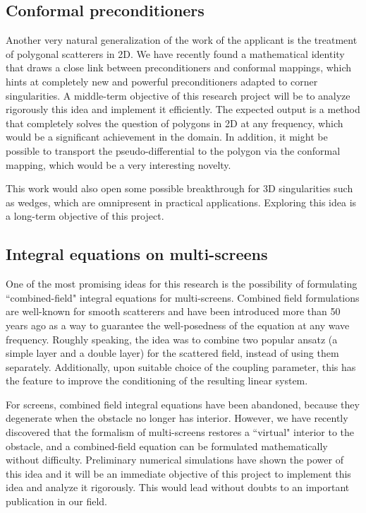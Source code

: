 \documentclass[]{article}
\begin{document}
\subsection*{Conformal preconditioners}

Another very natural generalization of the work of the applicant is the treatment of polygonal scatterers in 2D. We have recently found a mathematical identity that draws a close link between preconditioners and conformal mappings, which hints at completely new and powerful preconditioners adapted to corner singularities. A middle-term objective of this research project will be to analyze rigorously this idea and implement it efficiently. The expected output is a method that completely solves the question of polygons in 2D at any frequency, which would be a significant achievement in the domain. In addition, it might be possible to transport the pseudo-differential to the polygon via the conformal mapping, which would be a very interesting novelty. 

This work would also open some possible breakthrough for 3D singularities such as wedges, which are omnipresent in practical applications. Exploring this idea is a long-term objective of this project.


\subsection*{Integral equations on multi-screens}

One of the most promising ideas for this research is the possibility of formulating ``combined-field" integral equations for multi-screens. Combined field formulations are well-known for smooth scatterers and have been introduced more than 50 years ago \cite{brakhage1965dirichletsehe} as a way to guarantee the well-posedness of the equation at any wave frequency. Roughly speaking, the idea was to combine two popular ansatz (a simple layer and a double layer) for the scattered field, instead of using them separately. Additionally, upon suitable choice of the coupling parameter, this has the feature to improve the conditioning of the resulting linear system. 

For screens, combined field integral equations have been abandoned, because they degenerate when the obstacle no longer has interior. 
However, we have recently discovered that the formalism of multi-screens restores a ``virtual" interior to the obstacle, and a combined-field equation can be formulated mathematically without difficulty. Preliminary numerical simulations have shown the power of this idea and it will be an immediate objective of this project to implement this idea and analyze it rigorously. This would lead without doubts to an important publication in our field. 
\end{document}

